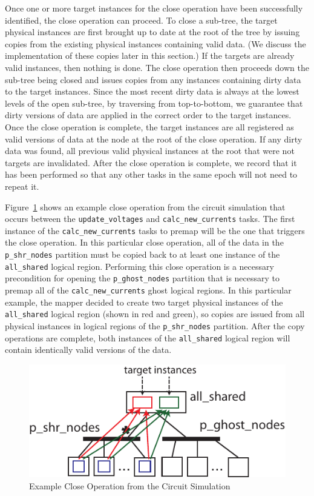 Once one or more target instances for the close
operation have been successfully identified, the 
close operation can proceed.  To close a sub-tree, 
the target physical instances are first brought
up to date at the root of the tree by 
issuing copies from the existing physical
instances containing valid data. (We 
discuss the implementation of these copies
later in this section.) If the targets are 
already valid instances, then nothing is done. 
The close operation then proceeds down the
sub-tree being closed and issues copies from
any instances containing dirty data to
the target instances.  Since the most 
recent dirty data is always at the lowest
levels of the open sub-tree, by traversing
from top-to-bottom, we guarantee that dirty
versions of data are applied in the correct
order to the target instances. Once the close
operation is complete, the target instances
are all registered as valid versions of data
at the node at the root of the close operation.
If any dirty data was found, all previous
valid physical instances at the root that 
were not targets are invalidated. After the
close operation is complete, we record that
it has been performed so that any other tasks 
in the same epoch will not need to repeat it.

Figure~\ref{fig:exclose} shows an example close
operation from the circuit simulation that occurs
between the {\tt update\_voltages} and 
{\tt calc\_new\_currents} tasks. The first instance
of the {\tt calc\_new\_currents} tasks to premap will 
be the one that triggers the close operation. In this
particular close operation, all of the data in the
{\tt p\_shr\_nodes} partition must be copied back
to at least one instance of the {\tt all\_shared}
logical region. Performing this close operation
is a necessary precondition for opening the 
{\tt p\_ghost\_nodes} partition that is necessary
to premap all of the {\tt calc\_new\_currents}
ghost logical regions. In this particular example,
the mapper decided to create two target physical
instances of the {\tt all\_shared} logical region
(shown in red and green), so copies are issued from 
all physical instances in logical regions of the 
{\tt p\_shr\_nodes} partition. After the copy 
operations are complete, both instances of the 
{\tt all\_shared} logical region will contain 
identically valid versions of the data.

\begin{figure}[t]
\centering
\includegraphics[scale=0.9]{figs/CloseOperation.pdf}
\caption{Example Close Operation from the Circuit Simulation\label{fig:exclose}}
\end{figure}

